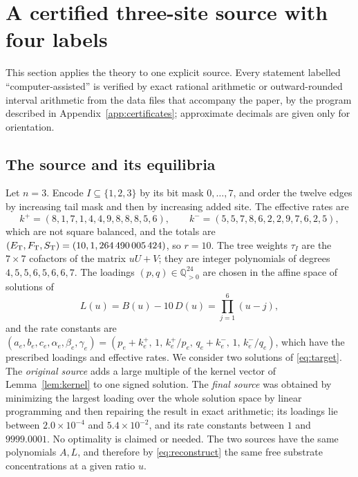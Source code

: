 \section{A certified three-site source with four labels}\label{sec:example}
This section applies the theory to one explicit source. Every statement labelled
``computer-assisted'' is verified by exact rational arithmetic or outward-rounded interval
arithmetic from the data files that accompany the paper, by the program described in
Appendix~\ref{app:certificates}; approximate decimals are given only for orientation.

\subsection{The source and its equilibria}
Let \(n=3\). Encode \(I\subseteq\{1,2,3\}\) by its bit mask \(0,\dots,7\), and order the twelve
edges by increasing tail mask and then by increasing added site. The effective rates are
\begin{equation}\label{eq:example-rates}
 k^+=(8,1,7,1,4,4,9,8,8,8,5,6),\qquad k^-=(5,5,7,8,6,2,2,9,7,6,2,5),
\end{equation}
which are not square balanced, and the totals are
\((E_{\mathrm T},F_{\mathrm T},S_{\mathrm T})=(10,1,264\,490\,005\,424)\), so \(r=10\). The tree weights \(\tau_I\) are the
\(7\times7\) cofactors of the matrix \(uU+V\); they are integer polynomials of degrees
\(4,5,5,6,5,6,6,7\). The loadings \((p,q)\in\mathbb Q^{24}_{>0}\) are chosen in the affine
space of solutions of
\begin{equation}\label{eq:target}
 L(u)=B(u)-10\,D(u)=\prod_{j=1}^{6}(u-j),
\end{equation}
and the rate constants are
\((a_e,b_e,c_e,\alpha_e,\beta_e,\gamma_e)=(p_e+k_e^+,\,1,\,k_e^+/p_e,\,q_e+k_e^-,\,1,\,k_e^-/q_e)\),
which have the prescribed loadings and effective rates. We consider two solutions of
\eqref{eq:target}. The \emph{original source} adds a large multiple of the kernel vector of
Lemma~\ref{lem:kernel} to one signed solution. The \emph{final source} was obtained by
minimizing the largest loading over the whole solution space by linear programming and then
repairing the result in exact arithmetic; its loadings lie between \(2.0\times10^{-4}\) and
\(5.4\times10^{-2}\), and its rate constants between \(1\) and \(9999.0001\). No optimality is
claimed or needed. The two sources have the same polynomials \(A,L\), and therefore by
\eqref{eq:reconstruct} the same free substrate concentrations at a given ratio \(u\).

